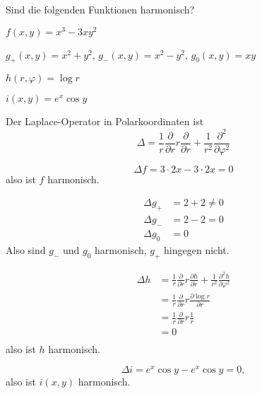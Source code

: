 Sind die folgenden Funktionen harmonisch?
\begin{teilaufgaben}
\item $f(x,y)=x^3-3xy^2$
\item $g_+(x,y)=x^2+y^2$, $g_-(x,y)=x^2-y^2$, $g_0(x,y)=xy$
\item $h(r,\varphi)=\log r$
\item $i(x,y)=e^x\cos y$
\end{teilaufgaben}

\begin{hinweis}
Der Laplace-Operator in Polarkoordinaten ist
\[
\Delta =
\frac1r\frac{\partial}{\partial r}r\frac{\partial}{\partial r}
+
\frac1{r^2}\frac{\partial^2}{\partial\varphi^2}
\]
\end{hinweis}

\begin{loesung}
\begin{teilaufgaben}
\item
\[
\Delta f
=
3\cdot 2x-3\cdot 2x=0
\]
also ist $f$ harmonisch.
\item
\begin{align*}
\Delta g_+
&=
2+2\ne 0
\\
\Delta g_-
&=
2-2=0
\\
\Delta g_0
&=
0
\end{align*}
Also sind $g_-$ und $g_0$ harmonisch, $g_+$ hingegen nicht.
\item
\begin{align*}
\Delta h&=
\frac1r\frac{\partial}{\partial r}r\frac{\partial h}{\partial r}
+
\frac1{r^2}\frac{\partial^2 h}{\partial\varphi^2}
\\
&=
\frac1r\frac{\partial}{\partial r}r\frac{\partial \log r}{\partial r}
\\
&=
\frac1r\frac{\partial}{\partial r}r\frac1r
\\
&=0
\\
\end{align*}
also ist $h$ harmonisch.
\item
\[
\Delta i=e^x\cos y-e^x\cos y=0,
\]
also ist $i(x,y)$ harmonisch.
\qedhere
\end{teilaufgaben}
\end{loesung}

